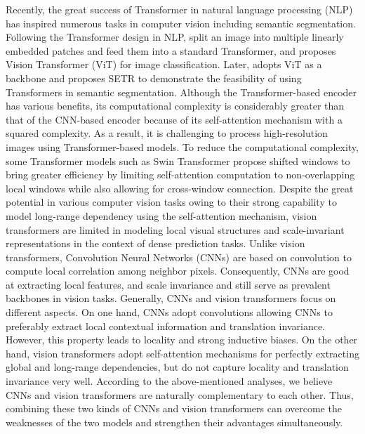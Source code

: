 \documentclass[journal]{IEEEtran}
\begin{document}
Recently, the great success of Transformer \cite{vaswani2017attention} in natural language processing (NLP) has inspired numerous tasks in computer vision including semantic segmentation. Following the Transformer design in NLP, \cite{dosovitskiy2020image} split an image into multiple linearly embedded patches and feed them into a standard Transformer, and proposes Vision Transformer (ViT) for image classification. Later, \cite{zheng2021rethinking} adopts ViT as a backbone and proposes SETR to demonstrate the feasibility of using Transformers in semantic segmentation. Although the Transformer-based encoder has various benefits, its computational complexity is considerably greater than that of the CNN-based encoder because of its self-attention mechanism with a squared complexity. As a result, it is challenging to process high-resolution images using Transformer-based models. To reduce the computational complexity, some Transformer models such as Swin Transformer \cite{liu2021swin} propose shifted windows to bring greater efficiency by limiting self-attention computation to non-overlapping local windows while also allowing for cross-window connection. 
Despite the great potential in various computer vision tasks owing to their strong capability to model long-range dependency using the self-attention mechanism, vision transformers are limited in modeling local visual structures and scale-invariant representations in the context of dense prediction tasks. Unlike vision transformers, Convolution Neural Networks (CNNs) are based on convolution to compute local correlation among neighbor pixels. Consequently, CNNs are good at extracting local features, and scale invariance and still serve as prevalent backbones in vision tasks. Generally, CNNs and vision transformers focus on different aspects. On one hand, CNNs adopt convolutions allowing CNNs to preferably extract local contextual information and translation invariance. However, this property leads to locality and strong inductive biases. On the other hand, vision transformers adopt self-attention mechanisms for perfectly extracting global and long-range dependencies, but do not capture locality and translation invariance very well. According to the above-mentioned analyses, we believe CNNs and vision transformers are naturally complementary to each other. Thus, combining these two kinds of CNNs and vision transformers can overcome the weaknesses of the two models and strengthen their advantages simultaneously.
\end{document}
